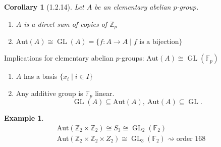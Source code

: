 \documentclass[11pt,leqno,oneside]{amsart}
\newcommand{\Z}{{\mathbb Z}} %
\newcommand{\Fp}{{\mathbb{F}_p}} %
\newcommand{\GL}{\operatorname{GL}} %
\newcommand{\isom}{\mathrel{\cong}}
\newcommand{\Aut}{\text{Aut}}  %
\newtheorem{cor}[thm]{Corollary}
\theoremstyle{definition}
\newtheorem*{example*}{Example}
\numberwithin{equation}{section}
\begin{document}
\begin{cor}[1.2.14]
  Let \(A\) be an elementary abelian
  \(p\)-group.
  \begin{enumerate}
  \item[(a)] \(A\) is a direct sum of
    copies of \(\Z_p\)
  \item[(b)]
    \(\Aut(A) \isom \GL(A)=\{f \colon A
    \to A \mid f \text{ is a
      bijection}\}\)
  \end{enumerate}
\end{cor}

Implications for elementary abelian
\(p\)-groups: \(\Aut(A) \isom \GL(\Fp)\)
\begin{enumerate}
\item[a] \(A\) has a basis
  \(\{x_i \mid i \in I\}\)
\item[b] Any additive group is \(\Fp\)
  linear.
  \[\GL(A) \subseteq \Aut(A),\ \Aut(A)
    \subseteq \GL.\]
\end{enumerate}

\begin{example*}
  \begin{gather*}
    \Aut(\Z_2 \times \Z_2) \isom S_3 \isom \GL_2(\mathbb{F}_2)\\
    \Aut(\Z_2 \times \Z_2 \times Z_2)
    \isom \GL_3(\mathbb{F}_2)
    \rightsquigarrow \text{order 168}
  \end{gather*}
\end{example*}
\end{document}
